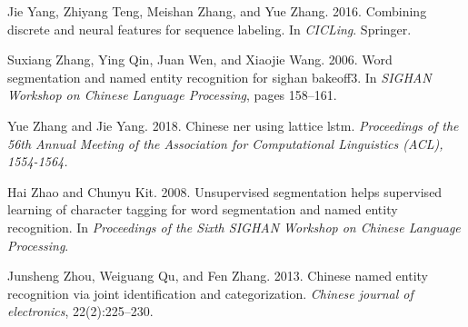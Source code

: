 \documentclass[11pt,a4paper]{article}
\begin{document}
\begin{CJK}{UTF8}{gbsn}
\begin{thebibliography}{35}
Jie Yang, Zhiyang Teng, Meishan Zhang, and Yue Zhang. 2016.
\newblock Combining discrete and neural features for sequence labeling.
\newblock In \emph{CICLing}. Springer.

Suxiang Zhang, Ying Qin, Juan Wen, and Xiaojie Wang. 2006.
\newblock Word segmentation and named entity recognition for sighan bakeoff3.
\newblock In \emph{SIGHAN Workshop on Chinese Language Processing}, pages
  158--161.

Yue Zhang and Jie Yang. 2018.
\newblock Chinese ner using lattice lstm.
\newblock \emph{Proceedings of the 56th Annual Meeting of the Association for
  Computational Linguistics (ACL), 1554-1564.}

Hai Zhao and Chunyu Kit. 2008.
\newblock Unsupervised segmentation helps supervised learning of character
  tagging for word segmentation and named entity recognition.
\newblock In \emph{Proceedings of the Sixth SIGHAN Workshop on Chinese Language
  Processing}.

Junsheng Zhou, Weiguang Qu, and Fen Zhang. 2013.
\newblock Chinese named entity recognition via joint identification and
  categorization.
\newblock \emph{Chinese journal of electronics}, 22(2):225--230.

\end{thebibliography}
 

\end{CJK}
\end{document}
